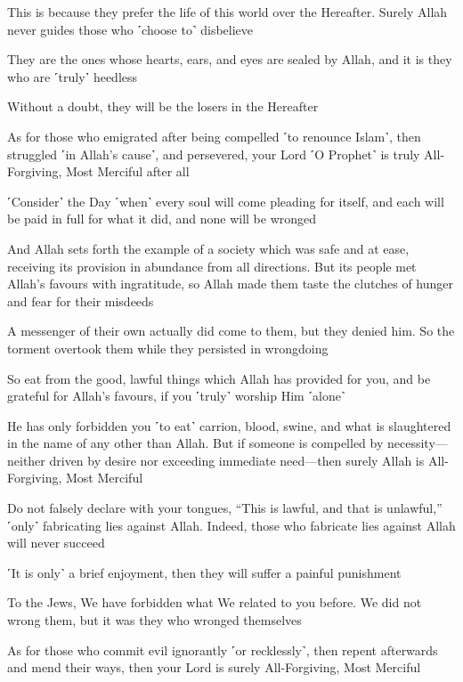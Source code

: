 This is because they prefer the life of this world over the Hereafter. Surely Allah never guides those who ˹choose to˺ disbelieve

They are the ones whose hearts, ears, and eyes are sealed by Allah, and it is they who are ˹truly˺ heedless

Without a doubt, they will be the losers in the Hereafter

As for those who emigrated after being compelled ˹to renounce Islam˺, then struggled ˹in Allah’s cause˺, and persevered, your Lord ˹O Prophet˺ is truly All-Forgiving, Most Merciful after all

˹Consider˺ the Day ˹when˺ every soul will come pleading for itself, and each will be paid in full for what it did, and none will be wronged

And Allah sets forth the example of a society which was safe and at ease, receiving its provision in abundance from all directions. But its people met Allah’s favours with ingratitude, so Allah made them taste the clutches of hunger and fear for their misdeeds

A messenger of their own actually did come to them, but they denied him. So the torment overtook them while they persisted in wrongdoing

So eat from the good, lawful things which Allah has provided for you, and be grateful for Allah’s favours, if you ˹truly˺ worship Him ˹alone˺

He has only forbidden you ˹to eat˺ carrion, blood, swine, and what is slaughtered in the name of any other than Allah. But if someone is compelled by necessity—neither driven by desire nor exceeding immediate need—then surely Allah is All-Forgiving, Most Merciful

Do not falsely declare with your tongues, “This is lawful, and that is unlawful,” ˹only˺ fabricating lies against Allah. Indeed, those who fabricate lies against Allah will never succeed

˹It is only˺ a brief enjoyment, then they will suffer a painful punishment

To the Jews, We have forbidden what We related to you before. We did not wrong them, but it was they who wronged themselves

As for those who commit evil ignorantly ˹or recklessly˺, then repent afterwards and mend their ways, then your Lord is surely All-Forgiving, Most Merciful


